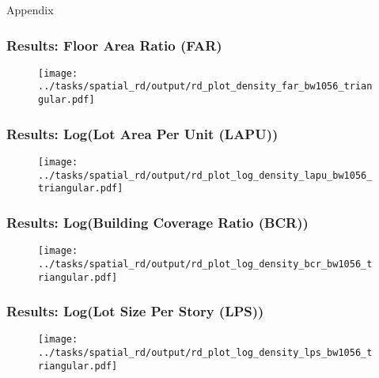 \begin{frame}[plain]
  \begin{center}{\LARGE Appendix}\end{center}
  \end{frame}
\begin{frame}[t,label=levels]
  \frametitle{Results: Floor Area Ratio (FAR)} 
  \begin{figure}
      \centering
      \texttt{[image: ../tasks/spatial\_rd/output/rd\_plot\_density\_far\_bw1056\_triangular.pdf]}
      \label{fig:spatial_rd_lapu}
  \end{figure}
  \vfill\hfill \hyperlink{far-main}{}
\end{frame}

\begin{frame}[t,label=lapu]
    \frametitle{Results: Log(Lot Area Per Unit (LAPU))} 
    \begin{figure}
        \centering
        \texttt{[image: ../tasks/spatial\_rd/output/rd\_plot\_log\_density\_lapu\_bw1056\_triangular.pdf]}
        \label{fig:spatial_rd_lapu}
    \end{figure}
    \vfill\hfill \hyperlink{far-main}{}
  \end{frame}

  \begin{frame}[t,label=bcr]
    \frametitle{Results: Log(Building Coverage Ratio (BCR))} 
    \begin{figure}
        \centering
        \texttt{[image: ../tasks/spatial\_rd/output/rd\_plot\_log\_density\_bcr\_bw1056\_triangular.pdf]}
        \label{fig:spatial_rd_lapu}
    \end{figure}
    \vfill\hfill \hyperlink{far-main}{}
  \end{frame}

  \begin{frame}[t,label=lps]
    \frametitle{Results: Log(Lot Size Per Story (LPS))} 
    \begin{figure}
        \centering
        \texttt{[image: ../tasks/spatial\_rd/output/rd\_plot\_log\_density\_lps\_bw1056\_triangular.pdf]}
        \label{fig:spatial_rd_lapu}
    \end{figure}
    \vfill\hfill \hyperlink{far-main}{}
  \end{frame}



